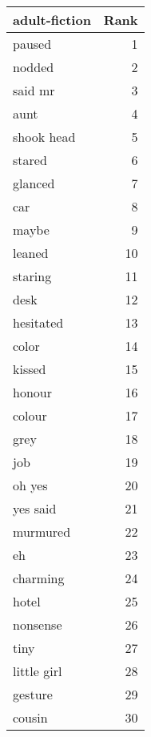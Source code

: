 \begin{table}
\label{tab:adult-fiction_terms}
\begin{tabular}{lr}
\toprule
adult-fiction & Rank \\
\midrule
paused & 1 \\
nodded & 2 \\
said mr & 3 \\
aunt & 4 \\
shook head & 5 \\
stared & 6 \\
glanced & 7 \\
car & 8 \\
maybe & 9 \\
leaned & 10 \\
staring & 11 \\
desk & 12 \\
hesitated & 13 \\
color & 14 \\
kissed & 15 \\
honour & 16 \\
colour & 17 \\
grey & 18 \\
job & 19 \\
oh yes & 20 \\
yes said & 21 \\
murmured & 22 \\
eh & 23 \\
charming & 24 \\
hotel & 25 \\
nonsense & 26 \\
tiny & 27 \\
little girl & 28 \\
gesture & 29 \\
cousin & 30 \\
\bottomrule
\end{tabular}
\end{table}
